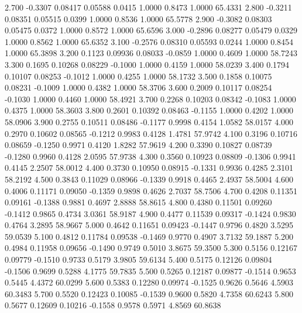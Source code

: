    2.700  -0.3307   0.08417   0.05588   0.0415   1.0000   0.8473   1.0000  65.4331
   2.800  -0.3211   0.08351   0.05515   0.0399   1.0000   0.8536   1.0000  65.5778
   2.900  -0.3082   0.08303   0.05475   0.0372   1.0000   0.8572   1.0000  65.6596
   3.000  -0.2896   0.08277   0.05479   0.0329   1.0000   0.8562   1.0000  65.6352
   3.100  -0.2576   0.08310   0.05593   0.0244   1.0000   0.8454   1.0000  65.3898
   3.200   0.1123   0.09936   0.08033  -0.0859   1.0000   0.4609   1.0000  58.7243
   3.300   0.1695   0.10268   0.08229  -0.1000   1.0000   0.4159   1.0000  58.0239
   3.400   0.1794   0.10107   0.08253  -0.1012   1.0000   0.4255   1.0000  58.1732
   3.500   0.1858   0.10075   0.08231  -0.1009   1.0000   0.4382   1.0000  58.3706
   3.600   0.2009   0.10117   0.08254  -0.1030   1.0000   0.4460   1.0000  58.4921
   3.700   0.2268   0.10203   0.08342  -0.1083   1.0000   0.4375   1.0000  58.3603
   3.800   0.2601   0.10392   0.08463  -0.1155   1.0000   0.4202   1.0000  58.0906
   3.900   0.2755   0.10511   0.08486  -0.1177   0.9998   0.4154   1.0582  58.0157
   4.000   0.2970   0.10602   0.08565  -0.1212   0.9983   0.4128   1.4781  57.9742
   4.100   0.3196   0.10716   0.08659  -0.1250   0.9971   0.4120   1.8282  57.9619
   4.200   0.3390   0.10827   0.08739  -0.1280   0.9960   0.4128   2.0595  57.9738
   4.300   0.3560   0.10923   0.08809  -0.1306   0.9941   0.4145   2.2507  58.0012
   4.400   0.3730   0.10950   0.08915  -0.1331   0.9936   0.4285   2.3101  58.2192
   4.500   0.3843   0.11029   0.08966  -0.1339   0.9918   0.4465   2.4937  58.5004
   4.600   0.4006   0.11171   0.09050  -0.1359   0.9898   0.4626   2.7037  58.7506
   4.700   0.4208   0.11351   0.09161  -0.1388   0.9881   0.4697   2.8888  58.8615
   4.800   0.4380   0.11501   0.09260  -0.1412   0.9865   0.4734   3.0361  58.9187
   4.900   0.4477   0.11539   0.09317  -0.1424   0.9830   0.4764   3.2895  58.9667
   5.000   0.4642   0.11651   0.09423  -0.1447   0.9796   0.4820   3.5295  59.0539
   5.100   0.4812   0.11784   0.09538  -0.1469   0.9770   0.4907   3.7132  59.1887
   5.200   0.4984   0.11958   0.09656  -0.1490   0.9749   0.5010   3.8675  59.3500
   5.300   0.5156   0.12167   0.09779  -0.1510   0.9733   0.5179   3.9805  59.6134
   5.400   0.5175   0.12126   0.09804  -0.1506   0.9699   0.5288   4.1775  59.7835
   5.500   0.5265   0.12187   0.09877  -0.1514   0.9653   0.5445   4.4372  60.0299
   5.600   0.5383   0.12280   0.09974  -0.1525   0.9626   0.5646   4.5903  60.3483
   5.700   0.5520   0.12423   0.10085  -0.1539   0.9600   0.5820   4.7358  60.6243
   5.800   0.5677   0.12609   0.10216  -0.1558   0.9578   0.5971   4.8569  60.8638
